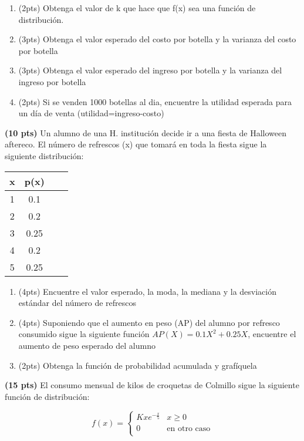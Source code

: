 \documentclass[addpoints]{exam}
\theoremstyle{mytheor}
\begin{document}
\begin{questions}
\begin{enumerate}[label=\Alph*)]
\item (2pts) Obtenga el valor de k que hace que f(x) sea una función de distribución.
\item (3pts) Obtenga el valor esperado del costo por botella y la varianza del costo por botella 
\item (3pts) Obtenga el valor esperado del ingreso por botella y la varianza del ingreso por botella 
\item (2pts) Si se venden 1000 botellas al dia, encuentre la utilidad esperada para un día de venta (utilidad=ingreso-costo)
\end{enumerate}

\question \textbf{(10 pts)}
Un alumno de una H. institución decide ir a una fiesta de Halloween aftereco. El número de refrescos (x) que tomará en toda la fiesta sigue la siguiente distribución:


\begin{center}
\begin{tabular}{ |c|c|c|c| } 
\hline
x & p(x) \\
\hline
1 & 0.1 \\
2 & 0.2 \\
3 & 0.25 \\
4 & 0.2 \\
5 & 0.25 \\
\hline
\end{tabular}
\end{center}

\begin{enumerate}[label=\Alph*)]
\item (4pts) Encuentre el valor esperado, la moda, la mediana y la desviación estándar del número de refrescos
\item (4pts) Suponiendo que el aumento en peso (AP) del alumno por refresco consumido sigue la siguiente función $AP(X) = 0.1X^2+0.25X$, encuentre el aumento de peso esperado del alumno
\item (2pts) Obtenga la función de probabilidad acumulada y grafíquela
\end{enumerate}

\question \textbf{(15 pts)}
El consumo mensual de kilos de croquetas de Colmillo sigue la siguiente función de distribución:

\[   
f(x) = 
     \begin{cases}
       Kxe^{-\frac{x}{5}} & x \geq 0\\
       0 & \text{en otro caso} \\
     \end{cases}
\]
$$$$


\end{questions}
\end{document}
